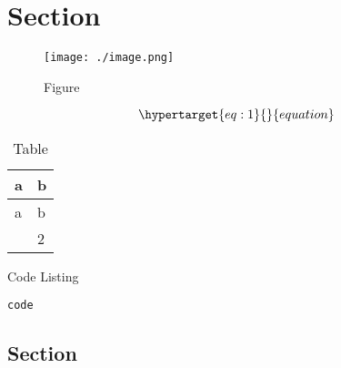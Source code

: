 \section{Section}\label{section}

\begin{figure}
\hypertarget{fig:1}{%
\centering
\texttt{[image: ./image.png]}
\caption{Figure}\label{fig:1}
}
\end{figure}

\begin{equation}\protect\hypertarget{eq:1}{}{equation}\label{eq:1}\end{equation}

\hypertarget{tbl:1}{}
\begin{longtable}[]{@{}ll@{}}
\caption{\label{tbl:1}Table}\tabularnewline
\toprule\noalign{}
a & b \\
\midrule\noalign{}
\endfirsthead
\toprule\noalign{}
a & b \\
\midrule\noalign{}
\endhead
\bottomrule\noalign{}
\endlastfoot
1 & 2 \\
\end{longtable}

\begin{codelisting}

\caption{Code Listing}

\hypertarget{lst:1}{%
\label{lst:1}}%
\begin{verbatim}
code
\end{verbatim}

\end{codelisting}

\subsection{Section}\label{section-1}
